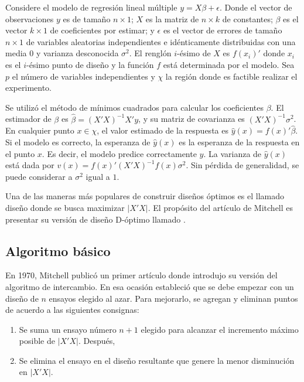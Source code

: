 Considere el modelo de regresión lineal múltiple $y = X \beta + \epsilon$. Donde el vector de observaciones $y$ es de tamaño $n \times 1$; $X$ es la matriz de $n \times k$ de constantes; $\beta$ es el vector $k \times 1$ de coeficientes por estimar; y $\epsilon$ es el vector de errores de tamaño $n \times 1$ de variables aleatorias independientes e idénticamente distribuidas con una media $0$ y varianza desconocida $\sigma^{2}$. El renglón $i$-ésimo de $X$ es $f(x_i)'$ donde $x_i$ es el $i$-ésimo punto de diseño y la función $f$ está determinada por el modelo. Sea $p$ el número de variables independientes y $\chi$ la región donde es factible realizar el experimento.

Se utilizó el método de mínimos cuadrados para calcular los coeficientes $\beta$. El estimador de $\beta$ es $\hat{\beta} = (X'X)^{-1} X'y$, y su matriz de covarianza es $(X'X)^{-1} \sigma^{2}$. En cualquier punto $x \in \chi$, el valor estimado de la  respuesta es $\hat{y} (x) = f(x)' \hat{\beta}$. Si el modelo es correcto, la esperanza de $\hat{y}(x)$ es la esperanza de la respuesta en el punto $x$. Es decir, el modelo predice correctamente $y$. La varianza de $\hat{y}(x)$ está dada por $v(x) = f(x)' (X'X)^{-1} f(x) \sigma^{2}$. Sin pérdida de generalidad, se puede considerar a $\sigma^{2}$ igual a $1$. 

Una de las maneras más populares de construir diseños óptimos es el llamado diseño  donde se busca maximizar $|X'X|$. El propósito del artículo de Mitchell es presentar su versión de diseño D-óptimo llamado . 

\subsection{Algoritmo básico}

En 1970, Mitchell publicó un primer artículo donde introdujo su versión del algoritmo de intercambio. En esa ocasión estableció que se debe empezar con un diseño de $n$ ensayos elegido al azar. Para mejorarlo, se agregan y eliminan puntos de acuerdo a las siguientes consignas: 

\begin{enumerate}
	\item Se suma un ensayo número $n+1$ elegido para alcanzar el incremento máximo posible de $|X'X|$. Después, 
	\item Se elimina el ensayo en el diseño resultante que genere la menor disminución en  $|X'X|$. 
\end{enumerate}

